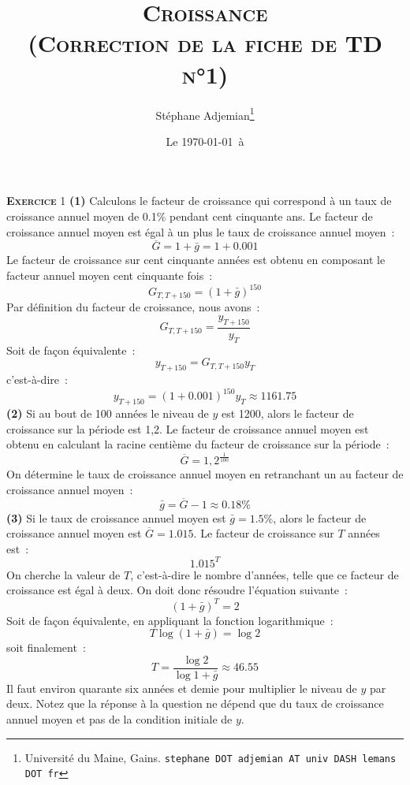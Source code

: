 \documentclass[10pt,a4paper,notitlepage]{report}
\newcommand{\exercice}[1]{\textsc{\textbf{Exercice}} #1}
\newcommand{\question}[1]{\textbf{(#1)}}
\begin{document}
\title{\textsc{Croissance\\ \small{(Correction de la fiche de TD n°1)}}}
\author{Stéphane Adjemian\thanks{Université du Maine, Gains. \texttt{stephane DOT adjemian AT univ DASH lemans DOT fr}}}
\date{Le \today\ à \thistime}

\maketitle



\exercice{1} \question{1} Calculons  le facteur  de
croissance  qui correspond  à un  taux de  croissance annuel  moyen de
0.1\% pendant  cent cinquante  ans.  Le  facteur de  croissance annuel
moyen est égal à un plus le taux de croissance annuel moyen :
\[
\overline{G} = 1 + \bar{g} = 1 + 0.001
\]
Le  facteur de  croissance sur  cent  cinquante années  est obtenu  en
composant le facteur annuel moyen cent cinquante fois :
\[
G_{T,T+150} = (1 + \bar{g})^{150}
\]
Par définition du facteur de croissance, nous avons :
\[
G_{T,T+150} = \frac{y_{T+150}}{y_{T}}
\]
Soit de façon équivalente :
\[
y_{T+150} = G_{T,T+150}y_T
\]
c'est-à-dire :
\[
y_{T+150} = (1+0.001)^{150} y_T \approx 1161.75
\]
\question{2} Si au bout de 100 années le niveau de $y$ est 1200, alors
le  facteur de  croissance  sur  la période  est  1,2.  Le facteur  de
croissance  annuel moyen  est obtenu  en  calculant la  racine centième du
facteur de croissance sur la période :
\[
\overline{G} = 1,2^{\frac{1}{100}}
\]
On détermine le  taux de croissance annuel moyen en  retranchant un au
facteur de croissance annuel moyen :
\[
\bar{g} = \overline{G}-1 \approx 0.18\%
\]
\question{3}  Si le  taux de  croissance annuel  moyen est  $\bar g  =
1.5\%$, alors le facteur de  croissance annuel moyen est $\overline{G}
= 1.015$. Le facteur de croissance sur $T$ années est :
\[
1.015^T
\]
On cherche  la valeur de  $T$, c'est-à-dire le nombre  d'années, telle
que ce  facteur de croissance est  égal à deux. On  doit donc résoudre
l'équation suivante :
\[
(1+\bar g)^T = 2
\]
Soit de façon équivalente, en appliquant la fonction logarithmique :
\[
T \log (1+\bar g) = \log 2 
\]
soit finalement :
\[
T = \frac{\log 2}{\log 1+\bar g} \approx 46.55
\]
Il faut environ quarante six années et demie pour multiplier le niveau
de $y$ par deux.  Notez que la réponse à la question  ne dépend que du
taux de  croissance annuel moyen  et pas  de la condition  initiale de
$y$.


\bigskip
\bigskip
\end{document}
